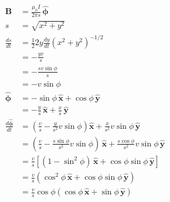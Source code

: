 \documentclass{article}
\renewcommand{\vec}[1]{\boldsymbol{\mathbf{#1}}}
\newcommand{\uvec}[1]{\hat{\vec{#1}}}
\begin{document}
\begin{align*}
  \vec{B}                             & = \frac{\mu_0 I}{2 \pi s} \,\uvec{\phi}                                                                                        \\
  s                                   & = \sqrt{x^2 + y^2}                                                                                                             \\
  \frac{d s}{d t}                     & = \frac{1}{2} 2 y \frac{d y}{d t} (x^2 + y^2)^{-1 / 2}                                                                         \\
                                      & = -\frac{y v}{s}                                                                                                               \\
                                      & = -\frac{s v \sin \phi}{s}                                                                                                     \\
                                      & = -v \sin \phi                                                                                                                 \\
  \uvec{\phi}                         & = -\sin \phi \,\uvec{x} + \cos \phi \,\uvec{y}                                                                                 \\
                                      & = -\frac{y}{s} \,\uvec{x} + \frac{x}{s} \,\uvec{y}                                                                             \\
  \frac{d \uvec{\phi}}{d t}           & = \left( \frac{v}{s} - \frac{y}{s^2} v \sin \phi \right) \uvec{x} + \frac{x}{s^2} v \sin \phi \,\uvec{y}                       \\
                                      & = \left( \frac{v}{s} - \frac{s \sin \phi}{s^2} v \sin \phi \right) \,\uvec{x} + \frac{s \cos \phi}{s^2} v \sin \phi \,\uvec{y} \\
                                      & = \frac{v}{s} [(1 - \sin^2 \phi) \,\uvec{x} + \cos \phi \sin \phi \,\uvec{y}]                                                  \\
                                      & = \frac{v}{s} (\cos^2 \phi \,\uvec{x} + \cos \phi \sin \phi \,\uvec{y})                                                        \\
                                      & = \frac{v}{s} \cos \phi (\cos \phi \,\uvec{x} + \sin \phi \,\uvec{y})                                                          \\

\end{align*}
\end{document}

